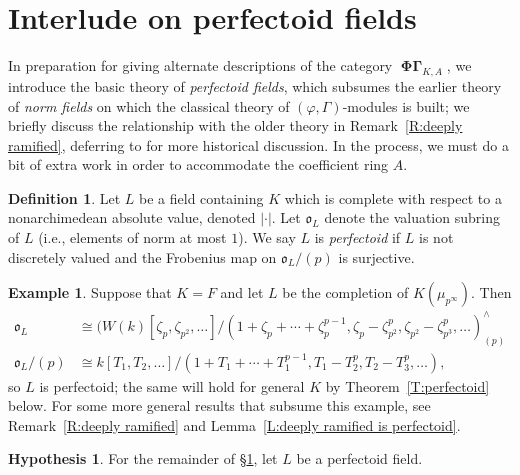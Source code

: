\documentclass[12pt]{amsart}
\theoremstyle{definition}
\newtheorem{defn}[theorem]{Definition}
\newtheorem{example}[theorem]{Example}
\newtheorem{hypothesis}[theorem]{Hypothesis}
\numberwithin{equation}{theorem}
\newcommand{\frako}{\mathfrak{o}}
\DeclareMathOperator{\PhiGamma}{\mathbf{\Phi \Gamma}}
\begin{document}
\section{Interlude on perfectoid fields}
\label{sec:perfectoid}

In preparation for giving alternate descriptions of the category $\PhiGamma_{K,A}$, we introduce the basic theory of \emph{perfectoid fields}, which subsumes the earlier theory of \emph{norm fields} on which the classical theory of $(\varphi, \Gamma)$-modules is built; 
we briefly discuss the relationship with the older theory in 
Remark~\ref{R:deeply ramified}, deferring to \cite{kedlaya-new-phigamma} for more historical discussion. In the process, we must do a bit of extra work in order to accommodate the coefficient ring $A$.

\begin{defn}
Let $L$ be a field containing $K$ which is complete with respect to a nonarchimedean absolute value, denoted $\left| \cdot \right|$. Let $\frako_L$ denote the valuation subring of $L$ (i.e., elements of norm at most $1$). We say $L$ is \emph{perfectoid} if $L$ is not discretely valued and the Frobenius map on $\frako_L/(p)$ is surjective.
\end{defn}

\begin{example}  \label{exa:cyclotomic}
Suppose that $K = F$ and let $L$ be the completion of $K(\mu_{p^\infty})$.
Then 
\begin{align*}
\frako_L &\cong (W(k)[\zeta_p, \zeta_{p^2}, \dots]/(1 + \zeta_p + \cdots + \zeta_p^{p-1}, \zeta_p - \zeta_{p^2}^p, \zeta_{p^2} - \zeta_{p^3}^p, \dots)^{\wedge}_{(p)} \\
\frako_L/(p) &\cong k[T_1, T_2, \dots]/(1+T_1 + \cdots + T_1^{p-1}, T_1 - T_2^p, T_2 - T_3^p, \dots),
\end{align*}
so $L$ is perfectoid; the same will hold for general $K$ by Theorem~\ref{T:perfectoid} below.
For some more general results that subsume this example, see Remark~\ref{R:deeply ramified} and Lemma~\ref{L:deeply ramified is perfectoid}.
\end{example}

\begin{hypothesis}
For the remainder of \S\ref{sec:perfectoid}, let $L$ be a perfectoid field.
\end{hypothesis}
\end{document}
